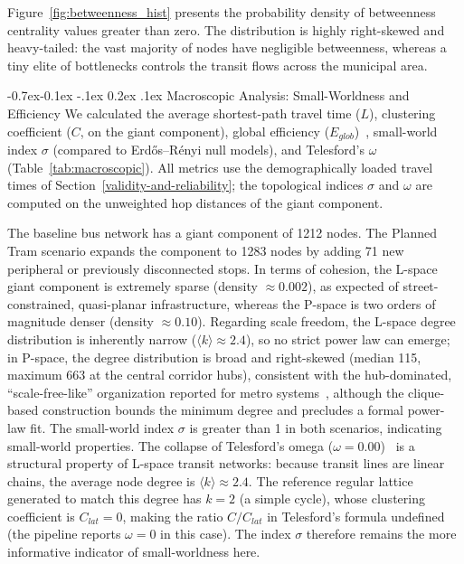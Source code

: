 \documentclass[12pt, a4paper]{article}
\makeatletter
\renewcommand\subsubsection{\@startsection{subsubsection}{3}{\z@}%
                                     {-0.7ex\@plus -0.1ex \@minus -.1ex}%
                                     {0.2ex \@plus .1ex}%
                                     {\normalfont\normalsize\bfseries}}
\makeatother
\begin{document}

Figure~\ref{fig:betweenness_hist} presents the probability density of betweenness centrality values greater than zero. The distribution is highly right-skewed and heavy-tailed: the vast majority of nodes have negligible betweenness, whereas a tiny elite of bottlenecks controls the transit flows across the municipal area.

\subsubsection{Macroscopic Analysis: Small-Worldness and Efficiency}
We calculated the average shortest-path travel time ($L$), clustering coefficient ($C$, on the giant component), global efficiency ($E_{glob}$)~\cite{latora}, small-world index $\sigma$ (compared to Erd\H{o}s--R\'enyi null models), and Telesford's $\omega$~\cite{telesford} (Table~\ref{tab:macroscopic}). All metrics use the demographically loaded travel times of Section~\ref{validity-and-reliability}; the topological indices $\sigma$ and $\omega$ are computed on the unweighted hop distances of the giant component.


The baseline bus network has a giant component of 1212 nodes. The Planned Tram scenario expands the component to 1283 nodes by adding 71 new peripheral or previously disconnected stops.
In terms of cohesion, the L-space giant component is extremely sparse (density $\approx 0.002$), as expected of street-constrained, quasi-planar infrastructure, whereas the P-space is two orders of magnitude denser (density $\approx 0.10$). Regarding scale freedom, the L-space degree distribution is inherently narrow ($\langle k \rangle \approx 2.4$), so no strict power law can emerge; in P-space, the degree distribution is broad and right-skewed (median 115, maximum 663 at the central corridor hubs), consistent with the hub-dominated, ``scale-free-like'' organization reported for metro systems~\cite{derrible}, although the clique-based construction bounds the minimum degree and precludes a formal power-law fit.
The small-world index $\sigma$ is greater than 1 in both scenarios, indicating small-world properties. The collapse of Telesford's omega ($\omega = 0.00$)~\cite{telesford} is a structural property of L-space transit networks: because transit lines are linear chains, the average node degree is $\langle k \rangle \approx 2.4$. The reference regular lattice generated to match this degree has $k = 2$ (a simple cycle), whose clustering coefficient is $C_{lat} = 0$, making the ratio $C/C_{lat}$ in Telesford's formula undefined (the pipeline reports $\omega = 0$ in this case). The index $\sigma$ therefore remains the more informative indicator of small-worldness here.
\end{document}
